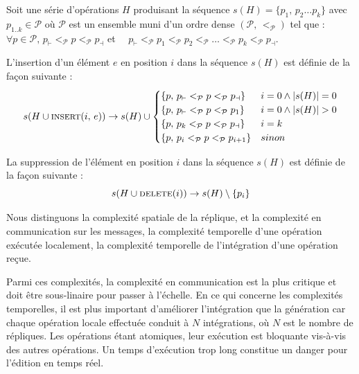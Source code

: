 \begin{definition}
  Soit une série d'opérations $H$ produisant la séquence
  $s(H) = \{p_1,\, p_2 \ldots p_k\}$ avec $p_{1..k} \in \mathcal{P}$ où
  $\mathcal{P}$ est un ensemble muni d'un ordre
  dense $(\mathcal{P},\,<_\mathcal{P})$ tel que : \\
  $\forall p\in\mathcal{P},\, p_\vdash <_\mathcal{P} p <_\mathcal{P} p_\dashv $
  \hfill et \ \
  $p_\vdash <_\mathcal{P} p_1 <_\mathcal{P} p_2 <_\mathcal{P} \ldots
  <_\mathcal{P} p_k <_\mathcal{P} p_\dashv$.
  
  \noindent L'insertion d'un élément $e$ en position $i$ dans la séquence $s(H)$
  est définie de la façon suivante :
  \begin{equation}
    s(H \cup \textsc{insert}(i,\, e)) \rightarrow s(H) \cup 
    \begin{cases}
      \{p,\, p_\vdash <_\mathcal{P} p <_\mathcal{P} p_\dashv \} & i = 0 \wedge |s(H)| = 0\\
      \{p,\, p_\vdash <_\mathcal{P} p <_\mathcal{P} p_1 \} & i = 0 \wedge |s(H)|>0\\
      \{p,\, p_k <_\mathcal{P} p <_\mathcal{P} p_\dashv \} & i = k\\
      \{p,\, p_i <_\mathcal{P} p <_\mathcal{P} p_{i+1} \} & sinon
    \end{cases}
  \end{equation}

  \noindent La suppression de l'élément en position $i$ dans la séquence $s(H)$
  est définie de la façon suivante :
  \begin{equation}
    s(H \cup \textsc{delete}(i)) \rightarrow s(H) \setminus \{ p_i \}
  \end{equation}
\end{definition}


Nous distinguons la complexité spatiale de la réplique, et la complexité en
communication sur les messages, la complexité temporelle d'une opération
exécutée localement, la complexité temporelle de l'intégration d'une opération
reçue.

\noindent Parmi ces complexités, la complexité en communication est la plus
critique et doit être sous-linaire pour passer à l'échelle. En ce qui concerne
les complexités temporelles, il est plus important d'améliorer l'intégration que
la génération car chaque opération locale effectuée conduit à $N$ intégrations,
où $N$ est le nombre de répliques.  Les opérations étant atomiques, leur
exécution est bloquante vis-à-vis des autres opérations. Un temps d'exécution
trop long constitue un danger pour l'édition en temps réel.

